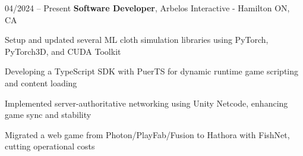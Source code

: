 \begin{twocolentry}{
    04/2024 – Present
}
\fontsize{11 pt}{11 pt}\textbf{Software Developer}, Arbelos Interactive - Hamilton ON, CA \end{twocolentry}

\vspace{0.10 cm}
\begin{onecolentry}
   \begin{highlights}
       \item Setup and updated several ML cloth simulation libraries using PyTorch, PyTorch3D, and CUDA Toolkit
       \item Developing a TypeScript SDK with PuerTS for dynamic runtime game scripting and content loading
       \item Implemented server-authoritative networking using Unity Netcode, enhancing game sync and stability
       \item Migrated a web game from Photon/PlayFab/Fusion to Hathora with FishNet, cutting operational costs
   \end{highlights}
\end{onecolentry}